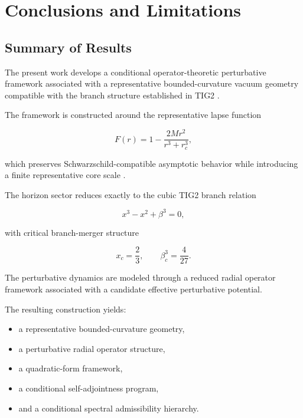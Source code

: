 
\section{Conclusions and Limitations}

\subsection{Summary of Results}

The present work develops a conditional operator-theoretic perturbative framework associated with a representative bounded-curvature vacuum geometry compatible with the branch structure established in TIG2 \cite{tig2}.

The framework is constructed around the representative lapse function

\begin{equation}
F(r)
=
1
-
\frac{2Mr^2}{r^3+r_c^3},
\end{equation}

which preserves Schwarzschild-compatible asymptotic behavior while introducing a finite representative core scale \cite{wald1984,chandrasekhar1983}.

The horizon sector reduces exactly to the cubic TIG2 branch relation

\begin{equation}
x^3 - x^2 + \beta^3 = 0,
\end{equation}

with critical branch-merger structure

\begin{equation}
x_c = \frac{2}{3},
\qquad
\beta_c^3 = \frac{4}{27}.
\end{equation}

The perturbative dynamics are modeled through a reduced radial operator framework associated with a candidate effective perturbative potential.

The resulting construction yields:
\begin{itemize}[leftmargin=0.6cm]
\item a representative bounded-curvature geometry,
\item a perturbative radial operator structure,
\item a quadratic-form framework,
\item a conditional self-adjointness program,
\item and a conditional spectral admissibility hierarchy.
\end{itemize}


